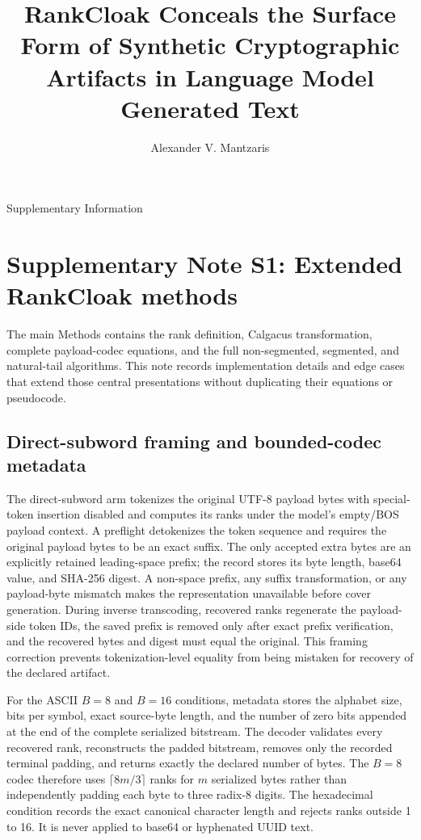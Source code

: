 \documentclass[fleqn,10pt]{wlscirep}
\title{RankCloak Conceals the Surface Form of Synthetic Cryptographic Artifacts in Language Model Generated Text}
\author[1,*]{Alexander V. Mantzaris}
\affil[1]{School of Data, Mathematical, and Statistical Sciences, University of Central Florida, Orlando, FL, United States of America}
\affil[*]{Correspondence: alexander.mantzaris@ucf.edu}
\begin{document}
\maketitle
\begin{center}\large Supplementary Information\end{center}
\linenumbers
\raggedbottom

\section*{Supplementary Note S1: Extended RankCloak methods}\label{si:s1}

The main Methods contains the rank definition, Calgacus transformation, complete payload-codec equations, and the full non-segmented, segmented, and natural-tail algorithms. This note records implementation details and edge cases that extend those central presentations without duplicating their equations or pseudocode.

\subsection*{Direct-subword framing and bounded-codec metadata}

The direct-subword arm tokenizes the original UTF-8 payload bytes with special-token insertion disabled and computes its ranks under the model's empty/BOS payload context. A preflight detokenizes the token sequence and requires the original payload bytes to be an exact suffix. The only accepted extra bytes are an explicitly retained leading-space prefix; the record stores its byte length, base64 value, and SHA-256 digest. A non-space prefix, any suffix transformation, or any payload-byte mismatch makes the representation unavailable before cover generation. During inverse transcoding, recovered ranks regenerate the payload-side token IDs, the saved prefix is removed only after exact prefix verification, and the recovered bytes and digest must equal the original. This framing correction prevents tokenization-level equality from being mistaken for recovery of the declared artifact.

For the ASCII \(B=8\) and \(B=16\) conditions, metadata stores the alphabet size, bits per symbol, exact source-byte length, and the number of zero bits appended at the end of the complete serialized bitstream. The decoder validates every recovered rank, reconstructs the padded bitstream, removes only the recorded terminal padding, and returns exactly the declared number of bytes. The \(B=8\) codec therefore uses \(\lceil8m/3\rceil\) ranks for \(m\) serialized bytes rather than independently padding each byte to three radix-8 digits. The hexadecimal condition records the exact canonical character length and rejects ranks outside 1 to 16. It is never applied to base64 or hyphenated UUID text.
\end{document}
